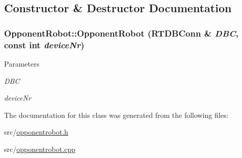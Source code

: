 \subsection{Constructor \& Destructor Documentation}
\hypertarget{classOpponentRobot_a315c08a9f17d278b1bb8067929b38f83}{
\subsubsection[{OpponentRobot}]{\setlength{\rightskip}{0pt plus 5cm}OpponentRobot::OpponentRobot (RTDBConn \& {\em DBC}, \/  const int {\em deviceNr})}}
\label{classOpponentRobot_a315c08a9f17d278b1bb8067929b38f83}

\begin{DoxyParams}{Parameters}
\item[{\em DBC}]\item[{\em deviceNr}]\end{DoxyParams}


The documentation for this class was generated from the following files:\begin{DoxyCompactItemize}
\item 
src/\hyperlink{opponentrobot_8h}{opponentrobot.h}\item 
src/\hyperlink{opponentrobot_8cpp}{opponentrobot.cpp}\end{DoxyCompactItemize}
